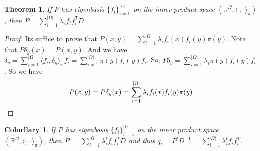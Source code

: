 \documentclass[utf8]{article}
\newtheorem{theorem}{Theorem}[section]
\newtheorem{corollary}{Colorllary}[section]
\def\<{\langle}
\def\>{\rangle}
\begin{document}
\begin{theorem}
  If $P$ has eigenbasis $\{f_i\}_{i=1}^{|\Omega|}$ on the inner product space $(\mathbb{R}^{\Omega}, \<\cdot, \cdot\>_\pi)$, then $P = \sum_{i=1}^{|\Omega|} \lambda_i f_i f_i^{T}D$
\end{theorem}
\begin{proof}
  Its suffice to prove that $P(x, y) = \sum_{i=1}^{|\Omega|} \lambda_i f_i(x)f_i(y)\pi(y)$.
  Note that $P\delta_y (x) = P(x, y)$.
  And we have $\delta_y = \sum_{i=1}^{|\Omega|} \<f_i, \delta_y\>_\pi f_i = \sum_{i=1}^{|\Omega|} \pi(y)f_i(y) f_i$.
  So, $P\delta_y = \sum_{i=1}^{|\Omega|}\lambda_i\pi(y)f_i(y)f_i$.
  So we have
  \[P(x, y) = P\delta_y (x) = \sum_{i=1}^{|\Omega|}\lambda_i f_i(x) f_i(y) \pi(y) \qedhere\]
\end{proof}
\begin{corollary}
  If $P$ has eigenbasis $\{f_i\}_{i=1}^{|\Omega|}$ on the inner product space $(\mathbb{R}^{\Omega}, \<\cdot, \cdot\>_\pi)$, then $P^t = \sum_{i=1}^{|\Omega|} \lambda_i^t f_i f_i^{T}D$ and thus $q_t = P^t D^{-1} = \sum_{i=1}^{|\Omega|}\lambda_i^tf_if_i^T$.
\end{corollary}
\end{document}

